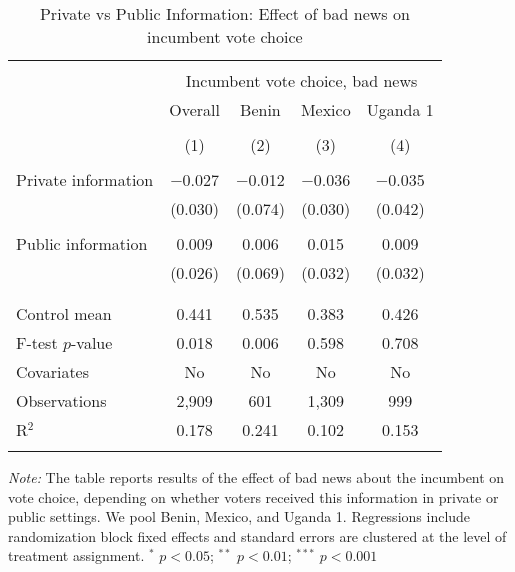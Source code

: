 \documentclass[]{article}
\begin{document}
\begin{table}[!htbp] \centering 
  \caption{Private vs Public Information: Effect of bad news on incumbent vote choice} 
  \label{pvt_pub_bad} 
\begin{tabular}{@{\extracolsep{5pt}}lcccc} 
\\[-1.8ex]\hline 
\hline \\[-1.8ex] 
 & \multicolumn{4}{c}{Incumbent vote choice, bad news} \\ 
\cline{2-5} 
 & Overall & Benin & Mexico & Uganda 1 \\ 
\\[-1.8ex] & (1) & (2) & (3) & (4)\\ 
\hline \\[-1.8ex] 
 Private information & $-$0.027 & $-$0.012 & $-$0.036 & $-$0.035 \\ 
  & (0.030) & (0.074) & (0.030) & (0.042) \\ 
  & & & & \\ 
 Public information & 0.009 & 0.006 & 0.015 & 0.009 \\ 
  & (0.026) & (0.069) & (0.032) & (0.032) \\ 
  & & & & \\ 
\hline \\[-1.8ex] 
Control mean & 0.441 & 0.535 & 0.383 & 0.426 \\ 
F-test $p$-value & 0.018 & 0.006 & 0.598 & 0.708 \\ 
Covariates & No & No & No & No \\ 
Observations & 2,909 & 601 & 1,309 & 999 \\ 
R$^{2}$ & 0.178 & 0.241 & 0.102 & 0.153 \\ 
\hline 
\hline \\[-1.8ex] 
\end{tabular} 
\begin{flushleft}\textit{Note:} The table reports results of the effect of bad news about the incumbent on vote choice, depending on whether voters received this information in private or public settings. We pool Benin, Mexico, and Uganda 1. Regressions include randomization block fixed effects and standard errors are clustered at the level of treatment assignment. $^*$ $p<0.05$; $^{**}$ $p<0.01$; $^{***}$ $p<0.001$ \end{flushleft}
\end{table}
\end{document}
